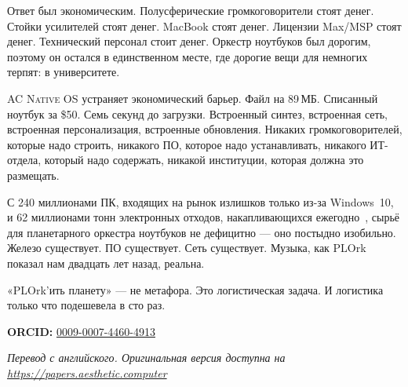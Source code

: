 \documentclass[10pt,letterpaper,twocolumn]{article}
\newcommand{\acos}{\textsc{AC Native OS}}
\begin{document}
Ответ был экономическим. Полусферические громкоговорители стоят денег. Стойки усилителей стоят денег. MacBook стоят денег. Лицензии Max/MSP стоят денег. Технический персонал стоит денег. Оркестр ноутбуков был дорогим, поэтому он остался в единственном месте, где дорогие вещи для немногих терпят: в университете.

\acos{} устраняет экономический барьер. Файл на 89\,МБ. Списанный ноутбук за \$50. Семь секунд до загрузки. Встроенный синтез, встроенная сеть, встроенная персонализация, встроенные обновления. Никаких громкоговорителей, которые надо строить, никакого ПО, которое надо устанавливать, никакого ИТ-отдела, который надо содержать, никакой институции, которая должна это размещать.

С 240 миллионами ПК, входящих на рынок излишков только из-за Windows~10, и 62 миллионами тонн электронных отходов, накапливающихся ежегодно~\citep{forti2024ewaste}, сырьё для планетарного оркестра ноутбуков не дефицитно --- оно постыдно изобильно. Железо существует. ПО существует. Сеть существует. Музыка, как PLOrk показал нам двадцать лет назад, реальна.

«PLOrk'ить планету» --- не метафора. Это логистическая задача. И логистика только что подешевела в сто раз.

\vspace{0.5em}
\noindent\textbf{ORCID:} \href{https://orcid.org/0009-0007-4460-4913}{0009-0007-4460-4913}

\vspace{0.5em}
\noindent\textit{Перевод с английского. Оригинальная версия доступна на \url{https://papers.aesthetic.computer}}




\end{document}
